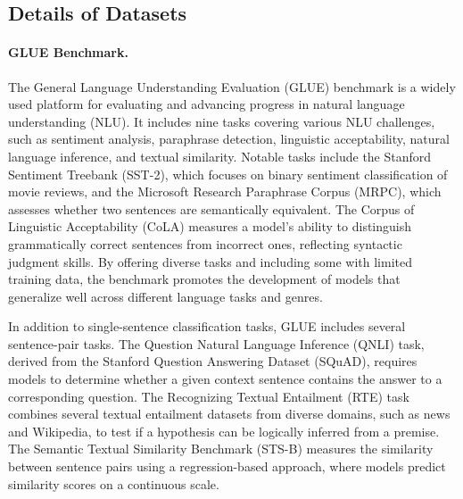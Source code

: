 
\subsection{Details of Datasets}
\paragraph{GLUE Benchmark.} 
\label{gluebench}
The General Language Understanding Evaluation (GLUE) benchmark\cite{wang2019glue} is a widely used platform for evaluating and advancing progress in natural language understanding (NLU). It includes nine tasks covering various NLU challenges, such as sentiment analysis, paraphrase detection, linguistic acceptability, natural language inference, and textual similarity. Notable tasks include the Stanford Sentiment Treebank (SST-2), which focuses on binary sentiment classification of movie reviews, and the Microsoft Research Paraphrase Corpus (MRPC), which assesses whether two sentences are semantically equivalent. The Corpus of Linguistic Acceptability (CoLA) measures a model's ability to distinguish grammatically correct sentences from incorrect ones, reflecting syntactic judgment skills. By offering diverse tasks and including some with limited training data, the benchmark promotes the development of models that generalize well across different language tasks and genres.

In addition to single-sentence classification tasks, GLUE includes several sentence-pair tasks. The Question Natural Language Inference (QNLI) task, derived from the Stanford Question Answering Dataset (SQuAD), requires models to determine whether a given context sentence contains the answer to a corresponding question. The Recognizing Textual Entailment (RTE) task combines several textual entailment datasets from diverse domains, such as news and Wikipedia, to test if a hypothesis can be logically inferred from a premise. The Semantic Textual Similarity Benchmark (STS-B) measures the similarity between sentence pairs using a regression-based approach, where models predict similarity scores on a continuous scale.

